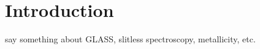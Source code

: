 
%
%

\chapter{Introduction}

say something about GLASS, slitless spectroscopy, metallicity, etc.


% 






